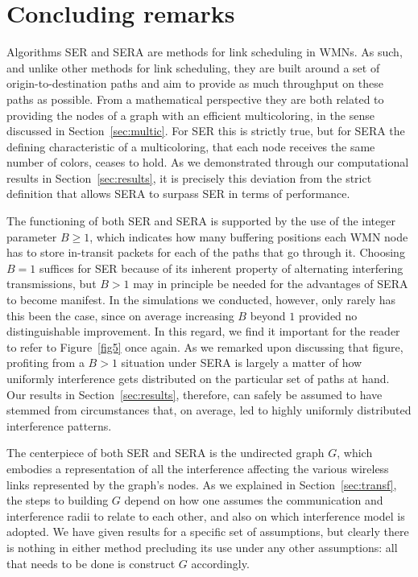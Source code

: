 \documentclass{article}
\begin{document}
\section{Concluding remarks}\label{sec:concl}

Algorithms SER and SERA are methods for link scheduling in WMNs. As such, and
unlike other methods for link scheduling, they are built around a set of
origin-to-destination paths and aim to provide as much throughput on these paths
as possible. From a mathematical perspective they are both related to providing
the nodes of a graph with an efficient multicoloring, in the sense discussed in
Section~\ref{sec:multic}. For SER this is strictly true, but for SERA the
defining characteristic of a multicoloring, that each node receives the same
number of colors, ceases to hold. As we demonstrated through our computational
results in Section~\ref{sec:results}, it is precisely this deviation from the
strict definition that allows SERA to surpass SER in terms of performance.

The functioning of both SER and SERA is supported by the use of the integer
parameter $B\ge 1$, which indicates how many buffering positions each WMN node
has to store in-transit packets for each of the paths that go through it.
Choosing $B=1$ suffices for SER because of its inherent property of alternating
interfering transmissions, but $B>1$ may in principle be needed for the
advantages of SERA to become manifest. In the simulations we conducted, however,
only rarely has this been the case, since on average increasing $B$ beyond $1$
provided no distinguishable improvement. In this regard, we find it important
for the reader to refer to Figure~\ref{fig5} once again. As we remarked upon
discussing that figure, profiting from a $B>1$ situation under SERA is largely
a matter of how uniformly interference gets distributed on the particular set of
paths at hand. Our results in Section~\ref{sec:results}, therefore, can safely
be assumed to have stemmed from circumstances that, on average, led to highly
uniformly distributed interference patterns.

The centerpiece of both SER and SERA is the undirected graph $G$, which embodies
a representation of all the interference affecting the various wireless links
represented by the graph's nodes. As we explained in Section~\ref{sec:transf},
the steps to building $G$ depend on how one assumes the communication and
interference radii to relate to each other, and also on which interference model
is adopted. We have given results for a specific set of assumptions, but clearly
there is nothing in either method precluding its use under any other
assumptions: all that needs to be done is construct $G$ accordingly.
\end{document}
